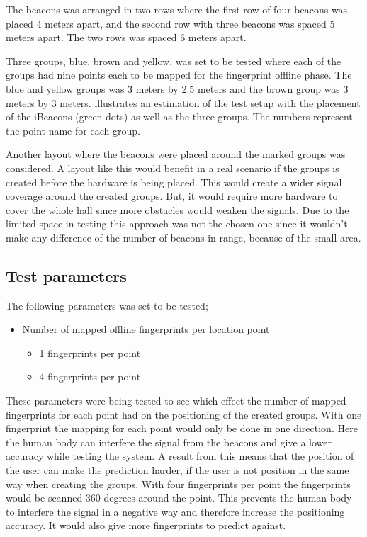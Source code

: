 \bigskip

The beacons was arranged in two rows where the first row of four beacons was placed 4 meters apart, and the second row with three beacons was spaced 5 meters apart.
The two rows was spaced 6 meters apart.

\bigskip


Three groups, blue, brown and yellow, was set to be tested where each of the groups had nine points each to be mapped for the fingerprint offline phase.
The blue and yellow groups was 3 meters by 2.5 meters and the brown group was 3 meters by 3 meters.
 illustrates an estimation of the test setup with the placement of the iBeacons (green dots) as well as the three groups.
The numbers represent the point name for each group.


Another layout where the beacons were placed around the marked groups was considered.
A layout like this would benefit in a real scenario if the groups is created before the hardware is being placed.
This would create a wider signal coverage around the created groups.
But, it would require more hardware to cover the whole hall since more obstacles would weaken the signals.
Due to the limited space in testing this approach was not the chosen one since it wouldn't make any difference of the number of beacons in range, because of the small area.

\newpage

\subsection{Test parameters}\label{sec:methodTestParameters}
The following parameters was set to be tested;

\begin{itemize}
\item Number of mapped offline fingerprints per location point
	\begin{itemize}
		\item 1 fingerprints per point
		\item 4 fingerprints per point
	\end{itemize}
\end{itemize}

These parameters were being tested to see which effect the number of mapped fingerprints for each point had on the positioning of the created groups.
With one fingerprint the mapping for each point would only be done in one direction.
Here the human body can interfere the signal from the beacons and give a lower accuracy while testing the system.
A result from this means that the position of the user can make the prediction harder, if the user is not position in the same way when creating the groups.
With four fingerprints per point the fingerprints would be scanned 360 degrees around the point. 
This prevents the human body to interfere the signal in a negative way and therefore increase the positioning accuracy.
It would also give more fingerprints to predict against.
